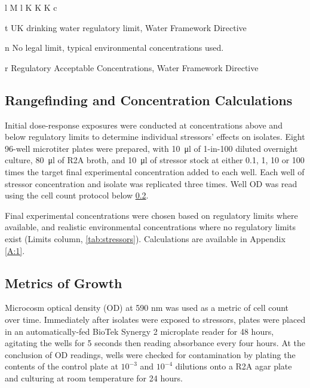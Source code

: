 \documentclass[final,1p,times]{elsarticle}
\begin{document}
\begin{landscape}
\begin{table}[h]
\begin{threeparttable}
\begin{tabular}{l M l K K K c}
\bottomrule
\end{tabular}
\caption{Summary of stressors including type, target concentration, product information and bacterial interactions.}
\label{tab:stressors}
\begin{tablenotes}
\item [t] UK drinking water regulatory limit, Water Framework Directive
\item [n] No legal limit, typical environmental concentrations used.
\item [r] Regulatory Acceptable Concentrations, Water Framework Directive 
\end{tablenotes}
\end{threeparttable}
\end{table}
\end{landscape}


\subsection{Rangefinding and Concentration Calculations}
\label{S:2:3}

Initial dose-response exposures were conducted at concentrations above and below regulatory limits to determine individual stressors' effects on isolates. Eight 96-well microtiter plates were prepared, with  \SI{10}{\ul} of 1-in-100 diluted overnight culture, \SI{80}{\ul} of R2A broth, and \SI{10}{\ul} of stressor stock at either 0.1, 1, 10 or 100 times the target final experimental concentration added to each well. Each well of stressor concentration and isolate was replicated three times. Well OD was read using the cell count protocol below \ref{S:2:4}.

Final experimental concentrations were chosen based on regulatory limits where available, and realistic environmental concentrations where no regulatory limits exist (Limits column, \cref{tab:stressors}). Calculations are available in Appendix \ref{A:1}.

\subsection{Metrics of Growth}
\label{S:2:4}

Microcosm optical density (OD) at 590 nm was used as a metric of cell count over time. Immediately after isolates were exposed to stressors, plates were placed in an automatically-fed BioTek Synergy 2 microplate reader for 48 hours, agitating the wells for 5 seconds then reading absorbance every four hours.  At the conclusion of OD readings, wells were checked for contamination by plating the contents of the control plate at $10^{-3}$ and $10^{-4}$ dilutions onto a R2A agar plate and culturing at room temperature for 24 hours.
\end{document}
